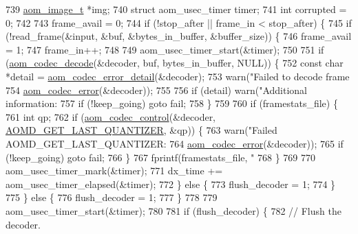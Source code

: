 \begin{DoxyCodeInclude}
{{{{{{{{{{{{{{{{{{{{{{{{{{{{{{{{{{{{{{{{739     \hyperlink{structaom__image}{aom\_image\_t} *img;
740     \textcolor{keyword}{struct }aom\_usec\_timer timer;
741     \textcolor{keywordtype}{int} corrupted = 0;
742 
743     frame\_avail = 0;
744     \textcolor{keywordflow}{if} (!stop\_after || frame\_in < stop\_after) \{
745       \textcolor{keywordflow}{if} (!read\_frame(&input, &buf, &bytes\_in\_buffer, &buffer\_size)) \{
746         frame\_avail = 1;
747         frame\_in++;
748 
749         aom\_usec\_timer\_start(&timer);
750 
751         \textcolor{keywordflow}{if} (\hyperlink{group__decoder_gab03fdb999d1f83a5896869a3ba5f68f7}{aom\_codec\_decode}(&decoder, buf, bytes\_in\_buffer, NULL)) \{
752           \textcolor{keyword}{const} \textcolor{keywordtype}{char} *detail = \hyperlink{group__codec_ga43a70562598b485685794a4e9d9d53f7}{aom\_codec\_error\_detail}(&decoder);
753           warn(\textcolor{stringliteral}{"Failed to decode frame %
754                \hyperlink{group__codec_ga50949c0854605c722832bbfb0803f5f4}{aom\_codec\_error}(&decoder));
755 
756           \textcolor{keywordflow}{if} (detail) warn(\textcolor{stringliteral}{"Additional information: %
757           \textcolor{keywordflow}{if} (!keep\_going) \textcolor{keywordflow}{goto} fail;
758         \}
759 
760         \textcolor{keywordflow}{if} (framestats\_file) \{
761           \textcolor{keywordtype}{int} qp;
762           \textcolor{keywordflow}{if} (\hyperlink{group__codec_ga6da974f4eeaba1fa74106b28d0fe6ac5}{aom\_codec\_control}(&decoder, 
      \hyperlink{group__aom__decoder_gga3865fd4b3192489baa9a5c3632ebe97baa984acc8b42df9c7d18fc3556a14fd29}{AOMD\_GET\_LAST\_QUANTIZER}, &qp)) \{
763             warn(\textcolor{stringliteral}{"Failed AOMD\_GET\_LAST\_QUANTIZER: %
764                  \hyperlink{group__codec_ga50949c0854605c722832bbfb0803f5f4}{aom\_codec\_error}(&decoder));
765             \textcolor{keywordflow}{if} (!keep\_going) \textcolor{keywordflow}{goto} fail;
766           \}
767           fprintf(framestats\_file, \textcolor{stringliteral}{"%
768         \}
769 
770         aom\_usec\_timer\_mark(&timer);
771         dx\_time += aom\_usec\_timer\_elapsed(&timer);
772       \} \textcolor{keywordflow}{else} \{
773         flush\_decoder = 1;
774       \}
775     \} \textcolor{keywordflow}{else} \{
776       flush\_decoder = 1;
777     \}
778 
779     aom\_usec\_timer\_start(&timer);
780 
781     \textcolor{keywordflow}{if} (flush\_decoder) \{
782       \textcolor{comment}{// Flush the decoder.}
}}}}}}}}}}}}}}}}}}}}}}}}}}}}}}}}}}}}}}}}}}}}
\end{DoxyCodeInclude}
